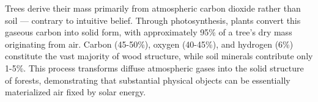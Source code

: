 Trees derive their mass primarily from atmospheric carbon dioxide rather than soil — contrary to intuitive belief. Through photosynthesis, plants convert this gaseous carbon into solid form, with approximately 95\% of a tree's dry mass originating from air. Carbon (45-50\%), oxygen (40-45\%), and hydrogen (6\%) constitute the vast majority of wood structure, while soil minerals contribute only 1-5\%. This process transforms diffuse atmospheric gases into the solid structure of forests, demonstrating that substantial physical objects can be essentially materialized air fixed by solar energy.
